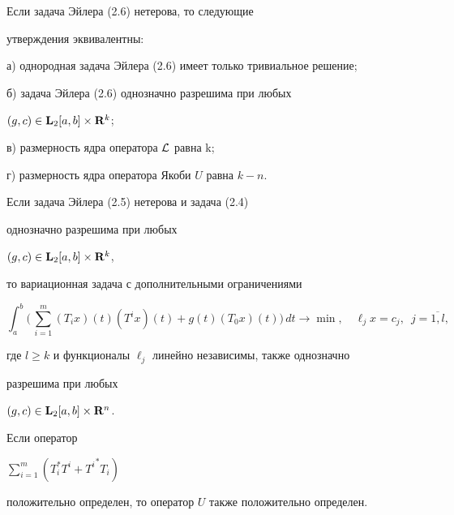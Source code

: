 \begin{cor} Если задача Эйлера (2.6) нетерова, то следующие


утверждения эквивалентны:





а) однородная задача Эйлера (2.6) имеет только тривиальное решение;





б) задача Эйлера (2.6) однозначно разрешима при любых


$(g,c)\in\bold L{}_2[a,b]\times\bold R{}^k$;





в) размерность ядра оператора $\cal L$ равна k;





г) размерность ядра оператора Якоби $U$ равна $k-n$.


\end{cor}





\begin{note} Если задача Эйлера (2.5) нетерова и задача (2.4)


однозначно разрешима при любых


$(g,c)\in\bold L{}_2[a,b]\times\bold R{}^k$,


то вариационная задача с дополнительными ограничениями


$$


\int_a^b\bigg(\,\sum_{i=1}^m


(T_ix)(t)(T^ix)(t)+g(t)(T_0x)(t)\bigg)\,


dt\longrightarrow\min,\quad


\ell_jx=c_j,\ \;j=\overline{1,l},


$$


где $l\ge k$ и функционалы $\ell_j$ линейно независимы, также однозначно


разрешима при любых


$(g,c)\in\bold L{}_2[a,b]\times\bold R{}^n$.


\end{note}





\begin{note} Если оператор


$\sum\limits_{i=1}^m(T_i^*T^i+{T^i}^*T_i)$


положительно определен, то оператор $U$ также положительно определен.


\end{note}





